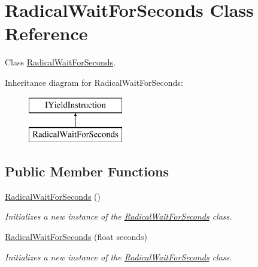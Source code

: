 \hypertarget{class_radical_wait_for_seconds}{}\section{Radical\+Wait\+For\+Seconds Class Reference}
\label{class_radical_wait_for_seconds}


Class \hyperlink{class_radical_wait_for_seconds}{Radical\+Wait\+For\+Seconds}.  


Inheritance diagram for Radical\+Wait\+For\+Seconds\+:\begin{figure}[H]
\begin{center}
\leavevmode
\includegraphics[height=2.000000cm]{class_radical_wait_for_seconds}
\end{center}
\end{figure}
\subsection*{Public Member Functions}
\begin{DoxyCompactItemize}
\item 
\hyperlink{class_radical_wait_for_seconds_a1703246c2cbb8f0b2c9eba55029d708c}{Radical\+Wait\+For\+Seconds} ()
\begin{DoxyCompactList}\small\item\em Initializes a new instance of the \hyperlink{class_radical_wait_for_seconds}{Radical\+Wait\+For\+Seconds} class. \end{DoxyCompactList}\item 
\hyperlink{class_radical_wait_for_seconds_a94164a7e1714d2aaafb429d3d397b208}{Radical\+Wait\+For\+Seconds} (float seconds)
\begin{DoxyCompactList}\small\item\em Initializes a new instance of the \hyperlink{class_radical_wait_for_seconds}{Radical\+Wait\+For\+Seconds} class. \end{DoxyCompactList}\end{DoxyCompactItemize}
